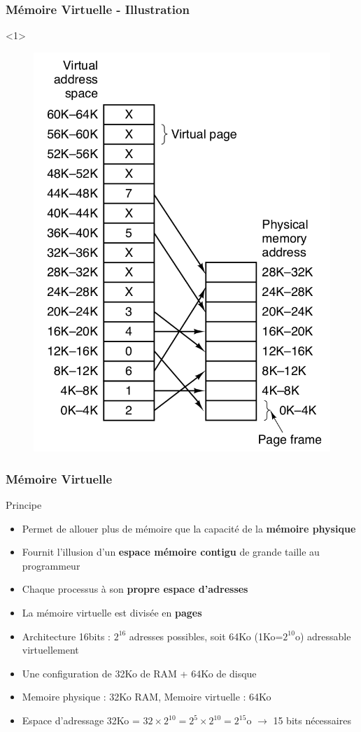 \documentclass[8pt]{beamer}
\begin{document}
\begin{frame}[c]
    \frametitle{Mémoire Virtuelle - Illustration}
    \begin{onlyenv}<1>
        \vspace*{1.25cm}
        \begin{figure}
            \centering
            \includegraphics[height=.45\textwidth]{figures/page_table_wo.png}
        \end{figure}
    \end{onlyenv}
\end{frame}

\begin{frame}
    \frametitle{Mémoire Virtuelle}
    \begin{block}{Principe}
        \begin{itemize}
            \item Permet de \fg{} allouer plus de mémoire
                  que la capacité de la \textbf{mémoire physique}
            \item Fournit l’illusion d’un \textbf{espace mémoire
                      contigu} de grande taille au programmeur
            \item Chaque processus \`a son \textbf{propre espace
                      d'adresses}
            \item La mémoire virtuelle est divisée en \textbf{pages}
        \end{itemize}
    \end{block}
    \begin{exampleblock}{}
        \begin{itemize}
            \item Architecture 16bits : $2^{16}$ adresses possibles, soit 64Ko
                  (1Ko=$2^{10}$o) adressable virtuellement
            \item Une configuration de 32Ko de RAM + 64Ko de disque
            \item Memoire physique : 32Ko RAM, Memoire virtuelle : 64Ko
            \item Espace d'adressage 32Ko = $32 \times 2^{10} = 2^5
                      \times2^{10} = 2^{15}$o $\to$ 15 bits n\'ecessaires
        \end{itemize}
    \end{exampleblock}
\end{frame}
\end{document}
